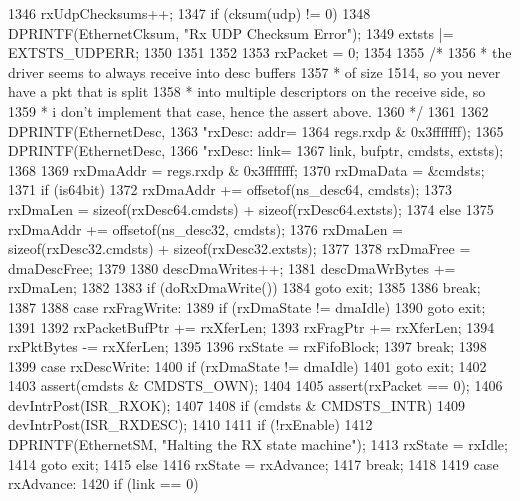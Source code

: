 \begin{DoxyCode}
{{{{{{1346                     rxUdpChecksums++;
1347                     if (cksum(udp) != 0) {
1348                         DPRINTF(EthernetCksum, "Rx UDP Checksum Error\n");
1349                         extsts |= EXTSTS_UDPERR;
1350                     }
1351                 }
1352             }
1353             rxPacket = 0;
1354 
1355             /*
1356              * the driver seems to always receive into desc buffers
1357              * of size 1514, so you never have a pkt that is split
1358              * into multiple descriptors on the receive side, so
1359              * i don't implement that case, hence the assert above.
1360              */
1361 
1362             DPRINTF(EthernetDesc,
1363                     "rxDesc: addr=%
1364                     regs.rxdp & 0x3fffffff);
1365             DPRINTF(EthernetDesc,
1366                     "rxDesc: link=%
1367                     link, bufptr, cmdsts, extsts);
1368 
1369             rxDmaAddr = regs.rxdp & 0x3fffffff;
1370             rxDmaData = &cmdsts;
1371             if (is64bit) {
1372                 rxDmaAddr += offsetof(ns_desc64, cmdsts);
1373                 rxDmaLen = sizeof(rxDesc64.cmdsts) + sizeof(rxDesc64.extsts);
1374             } else {
1375                 rxDmaAddr += offsetof(ns_desc32, cmdsts);
1376                 rxDmaLen = sizeof(rxDesc32.cmdsts) + sizeof(rxDesc32.extsts);
1377             }
1378             rxDmaFree = dmaDescFree;
1379 
1380             descDmaWrites++;
1381             descDmaWrBytes += rxDmaLen;
1382 
1383             if (doRxDmaWrite())
1384                 goto exit;
1385         }
1386         break;
1387 
1388       case rxFragWrite:
1389         if (rxDmaState != dmaIdle)
1390             goto exit;
1391 
1392         rxPacketBufPtr += rxXferLen;
1393         rxFragPtr += rxXferLen;
1394         rxPktBytes -= rxXferLen;
1395 
1396         rxState = rxFifoBlock;
1397         break;
1398 
1399       case rxDescWrite:
1400         if (rxDmaState != dmaIdle)
1401             goto exit;
1402 
1403         assert(cmdsts & CMDSTS_OWN);
1404 
1405         assert(rxPacket == 0);
1406         devIntrPost(ISR_RXOK);
1407 
1408         if (cmdsts & CMDSTS_INTR)
1409             devIntrPost(ISR_RXDESC);
1410 
1411         if (!rxEnable) {
1412             DPRINTF(EthernetSM, "Halting the RX state machine\n");
1413             rxState = rxIdle;
1414             goto exit;
1415         } else
1416             rxState = rxAdvance;
1417         break;
1418 
1419       case rxAdvance:
1420         if (link == 0) {
}}}}
\end{DoxyCode}
